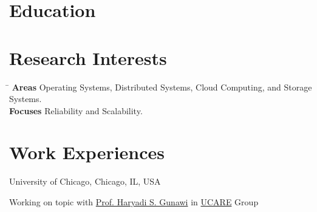 \documentclass[10pt]{article} %
\begin{document}
\section{Education}





\section{Research Interests}

\begin{tabbing}
\hspace{2.5cm} \= \kill
\textbf{Areas} \> Operating Systems, Distributed Systems, Cloud Computing, and Storage Systems. \\
\textbf{Focuses} \> Reliability and Scalability.
\end{tabbing}


\section{Work Experiences}

{University of Chicago, Chicago, IL, USA}
{\begin{minipage}{\smallertextwidth}
Working on  topic
with \href{http://ucare.cs.uchicago.edu/}{Prof. Haryadi S. Gunawi}
in \href{http://ucare.cs.uchicago.edu/}{UCARE} Group
\end{minipage}} 
\end{document}
